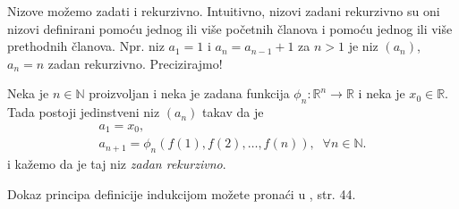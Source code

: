 Nizove možemo zadati i rekurzivno. Intuitivno, nizovi zadani rekurzivno su oni nizovi definirani pomoću jednog ili više početnih članova i pomoću jednog ili više prethodnih članova. Npr. niz \(a_1=1\) i \(a_n=a_{n-1}+1\) za \(n>1\) je niz \((a_n)\), \(a_n=n\) zadan rekurzivno. Precizirajmo!
\begin{remark}
Neka je \(n\in \mathbb{N}\) proizvoljan i neka je zadana funkcija \(\phi_n : \mathbb{R}^n\to \mathbb{R}\) i neka je \(x_0\in \mathbb{R}\). Tada postoji jedinstveni niz \((a_n)\) takav da je
\begin{gather*}
a_1=x_0,\\
a_{n+1}=\phi_n\left( f(1), f(2), \dots, f(n)\right),\;\; \forall n\in \mathbb{N}.
\end{gather*}
i kažemo da je taj niz \textit{zadan rekurzivno}. 
\end{remark} 
Dokaz principa definicije indukcijom možete pronaći u \cite{9}, str. 44.

